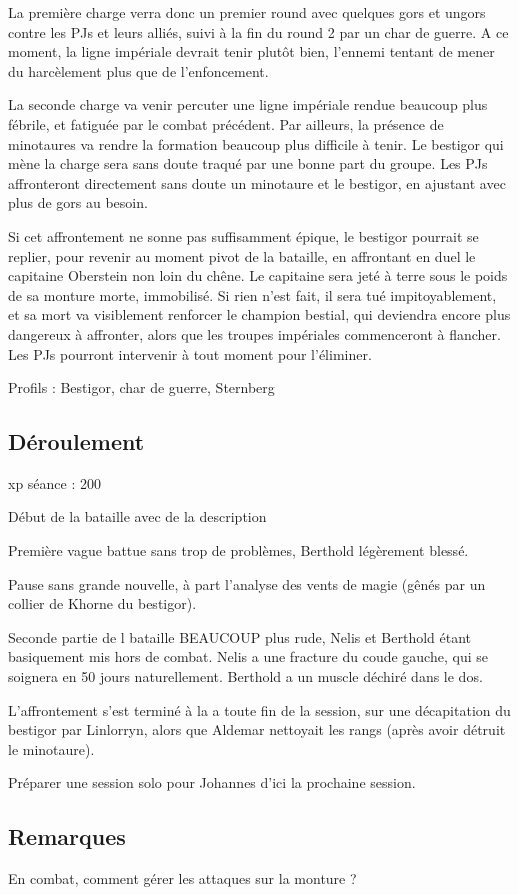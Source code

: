 \documentclass[10pt,a4paper]{book}
\begin{document}
La première charge verra donc un premier round avec quelques gors et ungors contre les PJs et leurs alliés, suivi à la fin du round 2 par un char de guerre. A ce moment, la ligne impériale devrait tenir plutôt bien, l'ennemi tentant de mener du harcèlement plus que de l'enfoncement.

La seconde charge va venir percuter une ligne impériale rendue beaucoup plus fébrile, et fatiguée par le combat précédent. Par ailleurs, la présence de minotaures va rendre la formation beaucoup plus difficile à tenir. Le bestigor qui mène la charge sera sans doute traqué par une bonne part du groupe. Les PJs affronteront directement sans doute un minotaure et le bestigor, en ajustant avec plus de gors au besoin.

Si cet affrontement ne sonne pas suffisamment épique, le bestigor pourrait se replier, pour revenir au moment pivot de la bataille, en affrontant en duel le capitaine Oberstein non loin du chêne. Le capitaine sera jeté à terre sous le poids de sa monture morte, immobilisé. Si rien n'est fait, il sera tué impitoyablement, et sa mort va visiblement renforcer le champion bestial, qui deviendra encore plus dangereux à affronter, alors que les troupes impériales commenceront à flancher. Les PJs pourront intervenir à tout moment pour l'éliminer.

Profils : Bestigor, char de guerre, Sternberg
\subsection{Déroulement}
xp séance : 200

Début de la bataille avec de la description

Première vague battue sans trop de problèmes, Berthold légèrement blessé.

Pause sans grande nouvelle, à part l'analyse des vents de magie (gênés par un collier de Khorne  du bestigor).

Seconde partie de l bataille BEAUCOUP plus rude, Nelis et Berthold étant basiquement mis hors de combat. Nelis a une fracture du coude gauche, qui se soignera en 50 jours naturellement. Berthold a un muscle déchiré dans le dos.

L'affrontement s'est terminé à la a toute fin de la session, sur une décapitation du bestigor par Linlorryn, alors que Aldemar nettoyait les rangs (après avoir détruit le minotaure).


Préparer une session solo pour Johannes d'ici la prochaine session.
\subsection{Remarques}
En combat, comment gérer les attaques sur la monture ?
\end{document}
